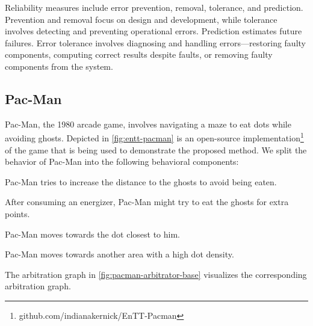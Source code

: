 Reliability measures include error prevention, removal, tolerance, and prediction.
Prevention and removal focus on design and development, while tolerance involves detecting and preventing operational errors.
Prediction estimates future failures.
Error tolerance involves diagnosing and handling errors—restoring faulty components, computing correct results despite faults, or removing faulty components from the system.

\subsection{Pac-Man}
Pac-Man, the 1980 arcade game, involves navigating a maze to eat dots while avoiding ghosts.
Depicted in \cref{fig:entt-pacman} is an open-source implementation\footnote{github.com/indianakernick/EnTT-Pacman} of the game that is being used to demonstrate the proposed method.
We split the behavior of Pac-Man into the following behavioral components:
\begin{description}[align=left]
    \item[Avoid Ghosts] Pac-Man tries to increase the distance to the ghosts to avoid being eaten.
    \item[Chase Ghosts] After consuming an energizer, Pac-Man might try to eat the ghosts for extra points.
    \item[Eat Closest Dot] Pac-Man moves towards the dot closest to him.
    \item[Change Dot Cluster] Pac-Man moves towards another area with a high dot density.
\end{description}

The arbitration graph in \cref{fig:pacman-arbitrator-base} visualizes the corresponding arbitration graph.

